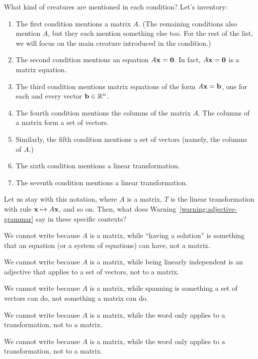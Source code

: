\documentclass{book}
\theoremstyle{ekimcustom}
\begin{document}
What kind of creatures are mentioned in each condition? Let's inventory:
\begin{enumerate}
\item The first condition mentions a matrix $A$. (The remaining conditions also mention $A$, but they each mention something else too. For the rest of the list, we will focus on the main creature introduced in the condition.)
\item The second condition mentions an equation $A{\bf x} = {\bf 0}$. In fact,  $A{\bf x} = {\bf 0}$ is a matrix equation.
\item The third condition mentions matrix equations of the form $A{\bf x} = {\bf b}$, one for each and every vector ${\bf b} \in \mathbb{R}^n$.
\item The fourth condition mentions the columns of the matrix $A$. The columns of a matrix form a set of vectors.
\item Similarly, the fifth condition mentions a set of vectors (namely, the columns of $A$.)
\item The sixth condition mentions a linear transformation.
\item The seventh condition mentions a linear transformation.
\end{enumerate}

Let us stay with this notation, where $A$ is a matrix, $T$ is the linear transformation with rule ${\bf x} \mapsto A{\bf x}$, and so on. Then, what does Warning~\ref{warning:adjective-grammar} say in these specific contexts?

\begin{bwarning}{}{}
We cannot write  because $A$ is a matrix, while ``having a solution'' is something that an equation (or a system of equations) can have, not a matrix.
\end{bwarning}
\begin{bwarning}{}{}
We cannot write  because $A$ is a matrix, while being linearly independent is an adjective that applies to a set of vectors, not to a matrix.
\end{bwarning}
\begin{bwarning}{}{}
We cannot write  because $A$ is a matrix, while spanning is something a set of vectors can do, not something a matrix can do.
\end{bwarning}
\begin{bwarning}{}{}
We cannot write  because $A$ is a matrix, while the word  only applies to a transformation, not to a matrix.
\end{bwarning}
\begin{bwarning}{}{}
We cannot write  because $A$ is a matrix, while the word  only applies to a transformation, not to a matrix.
\end{bwarning}
\end{document}
